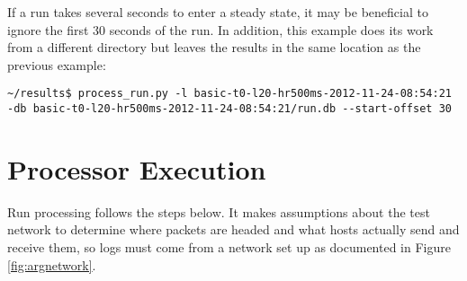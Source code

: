 \par If a run takes several seconds to enter a steady state, it may be beneficial to ignore the first 30 seconds of the run. In addition, this example does its work from a different directory but leaves the results in the same location as the previous example:
\begin{lstlisting}
~/results$ process_run.py -l basic-t0-l20-hr500ms-2012-11-24-08:54:21 -db basic-t0-l20-hr500ms-2012-11-24-08:54:21/run.db --start-offset 30
\end{lstlisting}

\section{Processor Execution}
\label{sec:proc_operation}
\par Run processing follows the steps below. It makes assumptions about the test network to determine where packets are headed and what hosts actually send and receive them, so logs must come from a network set up as documented in Figure \ref{fig:argnetwork}.

